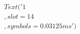 \documentclass[preview]{standalone}
\begin{document}
\begin{align*}
Text('1\\,slot = 14\\, symbols = 0.03125 ms')
\end{align*}
\end{document}
